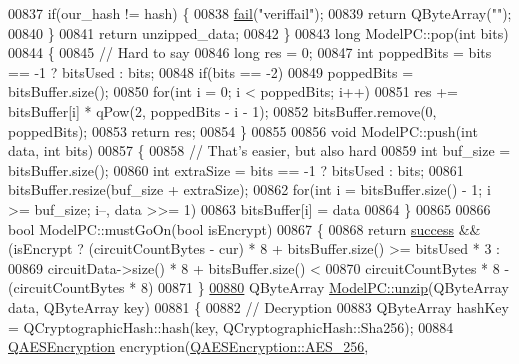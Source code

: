 \begin{DoxyCode}
{00837     \textcolor{keywordflow}{if}(our\_hash != hash) \{
00838         \hyperlink{class_model_p_c_a47464b59b7e37fcee25e55475708aabd}{fail}(\textcolor{stringliteral}{"veriffail"});
00839         \textcolor{keywordflow}{return} QByteArray(\textcolor{stringliteral}{""});
00840     \}
00841     \textcolor{keywordflow}{return} unzipped\_data;
00842 \}
00843 \textcolor{keywordtype}{long} ModelPC::pop(\textcolor{keywordtype}{int} bits)
00844 \{
00845     \textcolor{comment}{// Hard to say}
00846     \textcolor{keywordtype}{long} res = 0;
00847     \textcolor{keywordtype}{int} poppedBits = bits == -1 ? bitsUsed : bits;
00848     \textcolor{keywordflow}{if}(bits == -2)
00849         poppedBits = bitsBuffer.size();
00850     \textcolor{keywordflow}{for}(\textcolor{keywordtype}{int} i = 0; i < poppedBits; i++)
00851         res += bitsBuffer[i] * qPow(2, poppedBits - i - 1);
00852     bitsBuffer.remove(0, poppedBits);
00853     \textcolor{keywordflow}{return} res;
00854 \}
00855 
00856 \textcolor{keywordtype}{void} ModelPC::push(\textcolor{keywordtype}{int} data, \textcolor{keywordtype}{int} bits)
00857 \{
00858     \textcolor{comment}{// That's easier, but also hard}
00859     \textcolor{keywordtype}{int} buf\_size = bitsBuffer.size();
00860     \textcolor{keywordtype}{int} extraSize = bits == -1 ? bitsUsed : bits;
00861     bitsBuffer.resize(buf\_size + extraSize);
00862     \textcolor{keywordflow}{for}(\textcolor{keywordtype}{int} i = bitsBuffer.size() - 1; i >= buf\_size; i--, data >>= 1)
00863         bitsBuffer[i] = data %
00864 \}
00865 
00866 \textcolor{keywordtype}{bool} ModelPC::mustGoOn(\textcolor{keywordtype}{bool} isEncrypt)
00867 \{
00868     \textcolor{keywordflow}{return} \hyperlink{class_model_p_c_a945ffbbc44a832b953c191debd448f4c}{success} && (isEncrypt ? (circuitCountBytes - cur) * 8 + bitsBuffer.size() >= bitsUsed * 3
       :
00869                                    circuitData->size() * 8 + bitsBuffer.size() <
00870                                    circuitCountBytes * 8 - (circuitCountBytes * 8)%
00871 \}
\hypertarget{modelpc_8cpp_source.tex_l00880}{}\hyperlink{class_model_p_c_a6da88f166785a49f73b22c169f956fd0}{00880} QByteArray \hyperlink{class_model_p_c_a6da88f166785a49f73b22c169f956fd0}{ModelPC::unzip}(QByteArray data, QByteArray key)
00881 \{
00882     \textcolor{comment}{// Decryption}
00883     QByteArray hashKey = QCryptographicHash::hash(key, QCryptographicHash::Sha256);
00884     \hyperlink{class_q_a_e_s_encryption}{QAESEncryption} encryption(\hyperlink{class_q_a_e_s_encryption_abe48208f4f6c7d68e6a10b49b9d0b7bdacde97774ab1d4c609e04b0dd13a1e1f7}{QAESEncryption::AES\_256}, 
}
\end{DoxyCode}
